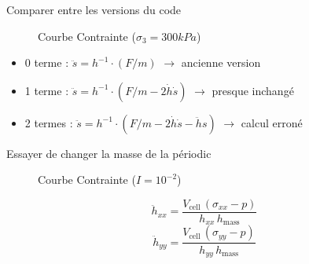 \documentclass[10pt]{beamer}
\begin{document}
\begin{frame}{Comparer entre les versions du code}
    \begin{figure}[h]
        \centering
        \scalebox{0.5}{}
        \caption{Courbe Contrainte ($\sigma_3 = 300kPa$)}
    \end{figure}
    \begin{itemize}
        \item 0 terme : $\ddot{s} = h^{-1} \cdot (F/m)$ $\rightarrow$ ancienne version
        \item 1 terme : $\ddot{s} = h^{-1} \cdot (F/m - 2 \dot{h} \dot{s})$ $\rightarrow$ presque inchangé
        \item 2 termes : $\ddot{s} = h^{-1} \cdot (F/m - 2 \dot{h} \dot{s} - \ddot{h} s)$ $\rightarrow$ calcul erroné
    \end{itemize}
\end{frame}


\begin{frame}{Essayer de changer la masse de la périodic}
    \begin{figure}[h]
        \centering
        \scalebox{0.5}{}
        \caption{Courbe Contrainte ($I = 10^{-2}$)}
    \end{figure}
    \[
        \ddot{h}_{xx} = \frac{V_{\text{cell}} \, (\sigma_{xx} - p)}{h_{xx} \, h_{\text{mass}}}
    \]
    \[
        \ddot{h}_{yy} = \frac{V_{\text{cell}} \, (\sigma_{yy} - p)}{h_{yy} \, h_{\text{mass}}}
    \]

\end{frame}
\end{document}
